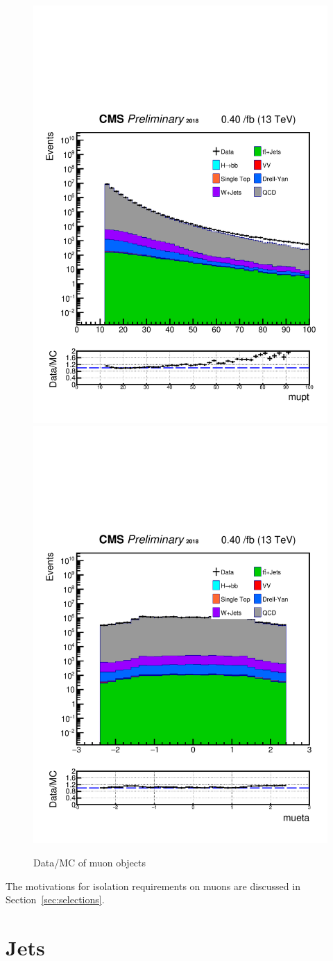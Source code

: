\begin{figure}[h!]
  \caption{Data/MC of muon objects}
  \label{fig:muons}
  \centering
  \includegraphics[width=0.47\linewidth]{figs/Data_AnalysisNoteplot_MS-15_ctauS-10_mupt.pdf}
  \includegraphics[width=0.47\linewidth]{figs/Data_AnalysisNoteplot_MS-15_ctauS-10_mueta.pdf}
\end{figure}

The motivations for isolation requirements on muons are discussed in Section~\ref{sec:selections}.


\section{Jets}\label{sec:jets}

